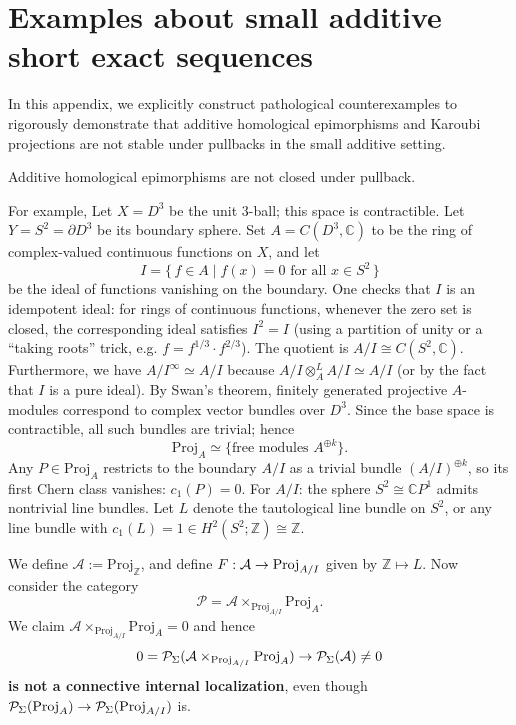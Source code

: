 \documentclass[a4paper,10pt, oneside]{amsart}
\begin{document}
	\section{Examples about small additive short exact sequences}\label{appendixA}
	In this appendix, we explicitly construct pathological counterexamples to rigorously demonstrate that additive homological epimorphisms and Karoubi projections are not stable under pullbacks in the small additive setting.
	\begin{exam}\label{exa1}
		Additive homological epimorphisms are not closed under pullback. 
		
		For example,
		Let $X = D^3$ be the unit 3-ball; this space is contractible. Let $Y = S^2 = \partial D^3$ be its boundary sphere. Set
		$A = C(D^3, \mathbb{C})$
		to be the ring of complex-valued continuous functions on $X$, and let
		$$I = \{\, f \in A \mid f(x) = 0 \text{ for all } x \in S^2 \,\}$$
		be the ideal of functions vanishing on the boundary. One checks that $I$ is an idempotent ideal: for rings of continuous functions, whenever the zero set is closed, the corresponding ideal satisfies $I^2 = I$ (using a partition of unity or a “taking roots” trick, e.g. $f = f^{1/3} \cdot f^{2/3}$). The quotient is
		$A/I \cong C(S^2, \mathbb{C}).$ Furthermore, we have $A/I^\infty\simeq A/I$ because $A/I \otimes^L_A A/I\simeq A/I$ (or by the fact that $I$ is a pure ideal).
		By Swan’s theorem, finitely generated projective $A$-modules correspond to complex vector bundles over $D^3$. Since the base space is contractible, all such bundles are trivial; hence
		$$\mathrm{Proj}_A \simeq \{ \text{free modules } A^{\oplus k} \}.$$
		Any $P \in \mathrm{Proj}_A$ restricts to the boundary $A/I$ as a trivial bundle $(A/I)^{\oplus k}$, so its first Chern class vanishes: $c_1(P) = 0$.
		For $A/I$: the sphere $S^2 \cong \mathbb{C}P^1$ admits nontrivial line bundles. Let $L$ denote the tautological line bundle on $S^2$, or any line bundle with
		$c_1(L) = 1 \in H^2(S^2;\mathbb{Z}) \cong \mathbb{Z}.$
		
		We define $\mathcal{A}:=\mathrm{Proj}_{\mathbb{Z}}$, and define $F: \mathcal{A} \to \mathrm{Proj}_{A/I}$ given by $\mathbb{Z}\mapsto L$.
		Now consider the category
		$$\mathcal{P}= \mathcal{A} \times_{\mathrm{Proj}_{A/I}} \mathrm{Proj}_A.$$
		We claim $ \mathcal{A} \times_{\mathrm{Proj}_{A/I}} \mathrm{Proj}_A=0$ and hence $$0=\mathcal{P}_{\Sigma}( \mathcal{A} \times_{\mathrm{Proj}_{A/I}} \mathrm{Proj}_A)\to \mathcal{P}_{\Sigma}(\mathcal{A})\neq 0$$ \textbf{is not a connective internal localization}, even though $\mathcal{P}_{\Sigma}(\mathrm{Proj}_A)\to \mathcal{P}_{\Sigma}(\mathrm{Proj}_{A/I})$ is.
		

\end{exam}
\end{document}
